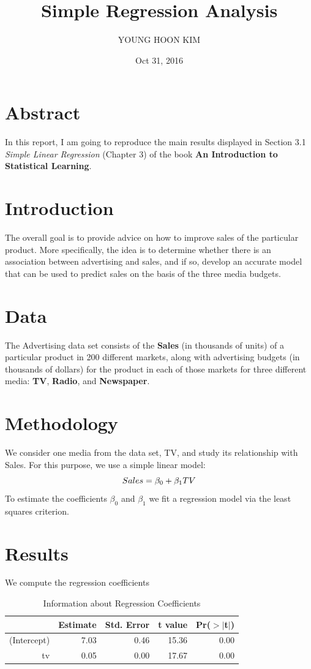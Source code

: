 \documentclass{article}\usepackage[]{graphicx}\usepackage[]{color}
\title{Simple Regression Analysis}
\author{YOUNG HOON KIM}
\date{Oct 31, 2016}
\begin{document}
\maketitle



\section*{Abstract} In this report, I am going to reproduce the main results displayed in Section 3.1 \emph{Simple Linear Regression} (Chapter 3) of the book \textbf{An Introduction to Statistical Learning}.

\section*{Introduction} The overall goal is to provide advice on how to improve sales of the particular product. More specifically, the idea is to determine whether there is an association between advertising and sales, and if so, develop an accurate model that can be used to predict sales on the basis of the three media budgets.  

\section*{Data} The Advertising data set consists of the \textbf{Sales} (in thousands of units) of a particular product in 200 different markets, along with advertising budgets (in thousands of dollars) for the product in each of those markets for three different media: \textbf{TV}, \textbf{Radio}, and \textbf{Newspaper}.

\section*{Methodology}
We consider one media from the data set, TV, and study its relationship with Sales. For this purpose, we use a simple linear model:
\begin{equation}
\centering
Sales= \beta_0 + \beta_1TV
\end{equation}
To estimate the coefficients $\beta_0$ and $\beta_1$ we fit a regression model via the least squares criterion.\\

\section*{Results} We compute the regression coefficients\\
\begin{table}[!h]
\centering
\caption{Information about Regression Coefficients} 
\begin{tabular}{rrrrr}
  \hline
 & Estimate & Std. Error & t value & Pr($>$$|$t$|$) \\ 
  \hline
(Intercept) & 7.03 & 0.46 & 15.36 & 0.00 \\ 
  tv & 0.05 & 0.00 & 17.67 & 0.00 \\ 
   \hline
\end{tabular}
\end{table}
\end{document}
